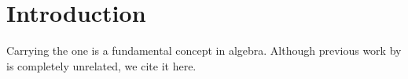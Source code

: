 \section{Introduction}
\label{section:introduction}

Carrying the one is a fundamental concept in algebra.
Although previous work by \cite{BergmannHerzog:2019:1} is completely unrelated, we cite it here.

\lipsum
